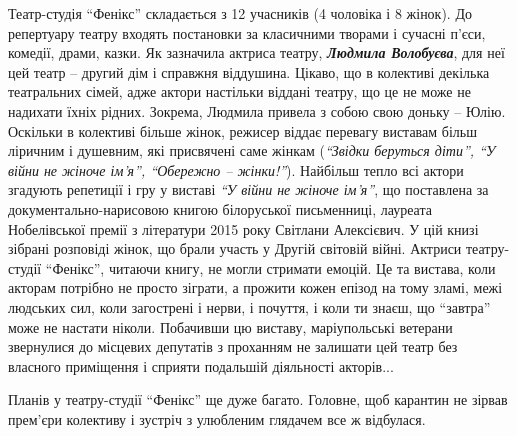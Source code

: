 
Театр-студія \enquote{Фенікс} складається з 12 учасників (4 чоловіка і 8 жінок). До
репертуару театру входять постановки за класичними творами і сучасні п'єси,
комедії, драми, казки. Як зазначила актриса театру, \emph{\textbf{Людмила Волобуєва}}, для неї
цей театр – другий дім і справжня віддушина. Цікаво, що в колективі декілька
театральних сімей, адже актори настільки віддані театру, що це не може не
надихати їхніх рідних. Зокрема, Людмила привела з собою свою доньку – Юлію.
Оскільки в колективі більше жінок, режисер віддає перевагу виставам більш
ліричним і душевним, які присвячені саме жінкам (\emph{\enquote{Звідки беруться діти}, \enquote{У
війни не жіноче ім'я}, \enquote{Обережно – жінки!}}). Найбільш тепло всі актори згадують
репетиції і гру у виставі \emph{\enquote{У війни не жіноче ім'я}}, що поставлена за
документально-нарисовою книгою білоруської письменниці, лауреата Нобелівської
премії з літератури 2015 року Світлани Алексієвич. У цій книзі зібрані
розповіді жінок, що брали участь у Другій світовій війні. Актриси театру-студії
\enquote{Фенікс}, читаючи книгу, не могли стримати емоцій. Це та вистава, коли акторам
потрібно не просто зіграти, а прожити кожен епізод на тому зламі, межі людських
сил, коли загострені і нерви, і почуття, і коли ти знаєш, що \enquote{завтра} може не
настати ніколи. Побачивши цю виставу, маріупольські ветерани звернулися до
місцевих депутатів з проханням не залишати цей театр без власного приміщення і
сприяти подальшій діяльності акторів...

Планів у театру-студії \enquote{Фенікс} ще дуже багато. Головне, щоб карантин не зірвав
прем'єри колективу і зустріч з улюбленим глядачем все ж відбулася.

